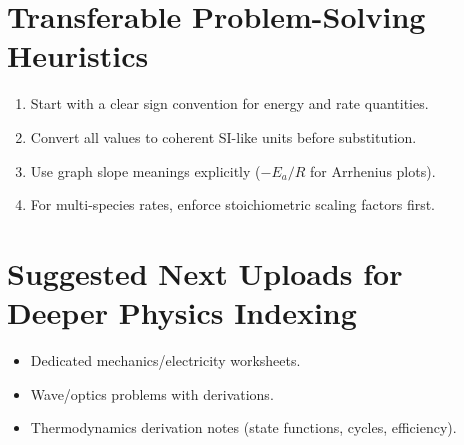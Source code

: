 \documentclass[11pt]{article}
\begin{document}
\section*{Transferable Problem-Solving Heuristics}
\begin{enumerate}[leftmargin=*]
  \item Start with a clear sign convention for energy and rate quantities.
  \item Convert all values to coherent SI-like units before substitution.
  \item Use graph slope meanings explicitly ($-E_a/R$ for Arrhenius plots).
  \item For multi-species rates, enforce stoichiometric scaling factors first.
\end{enumerate}

\section*{Suggested Next Uploads for Deeper Physics Indexing}
\begin{itemize}[leftmargin=*]
  \item Dedicated mechanics/electricity worksheets.
  \item Wave/optics problems with derivations.
  \item Thermodynamics derivation notes (state functions, cycles, efficiency).
\end{itemize}
\end{document}

